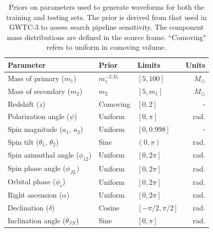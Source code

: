 \begin{table}
\centering
\begin{tabular}{lllr}
\hline
\hline
Parameter & Prior & Limits & Units\\
\hline
Mass of primary ($m_1$) & $m_1^{-2.35}$ & $[5, 100]$ & $M_{\odot}$\\
Mass of secondary ($m_2$) & $m_2$ & $[5, m_1]$ & $M_{\odot}$\\
Redshift ($z$) & Comoving & $[0, 2]$ & -\\
Polarization angle ($\psi$) & Uniform & $[0, \pi]$ & rad.\\
Spin magnitude ($a_1$, $a_2$) & Uniform & $[0, 0.998]$ & -\\
Spin tilt ($\theta_1$, $\theta_2$) & Sine & $(0, \pi)$ & rad.\\
Spin azimuthal angle ($\phi_{12}$) & Uniform & $[0, 2\pi]$ & rad.\\
Spin phase angle ($\phi_{JL}$) & Uniform & $[0, 2\pi]$ & rad.\\
Orbital phase ($\phi_{c}$) & Uniform & $[0, 2\pi]$ & rad.\\
Right ascension ($\alpha$) & Uniform & $[0, 2\pi]$ & rad.\\
Declination ($\delta$) & Cosine & $[-\pi/2, \pi/2]$ & rad.\\
Inclination angle ($\theta_{JN}$) & Sine & $[0, \pi]$ & rad.\\
\hline
\hline
\end{tabular}
\caption[Priors on parameters used to generate waveforms for training and testing Aframe]{Priors on parameters used to generate waveforms for both the training and testing sets. The prior is derived from that used in GWTC-3 to assess search pipeline sensitivity. The component mass distributions are defined in the source frame. ``Comoving" refers to uniform in comoving volume.}
\label{o3cat_tab:priors}
\end{table}